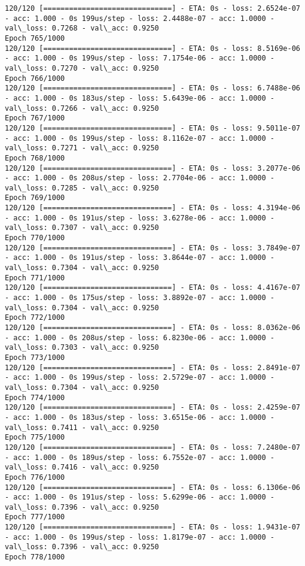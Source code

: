 \documentclass[11pt]{article}
\begin{document}
\begin{Verbatim}[commandchars=\\\{\}]
120/120 [==============================] - ETA: 0s - loss: 2.6524e-07 - acc: 1.000 - 0s 199us/step - loss: 2.4488e-07 - acc: 1.0000 - val\_loss: 0.7268 - val\_acc: 0.9250
Epoch 765/1000
120/120 [==============================] - ETA: 0s - loss: 8.5169e-06 - acc: 1.000 - 0s 199us/step - loss: 7.1754e-06 - acc: 1.0000 - val\_loss: 0.7270 - val\_acc: 0.9250
Epoch 766/1000
120/120 [==============================] - ETA: 0s - loss: 6.7488e-06 - acc: 1.000 - 0s 183us/step - loss: 5.6439e-06 - acc: 1.0000 - val\_loss: 0.7266 - val\_acc: 0.9250
Epoch 767/1000
120/120 [==============================] - ETA: 0s - loss: 9.5011e-07 - acc: 1.000 - 0s 199us/step - loss: 8.1162e-07 - acc: 1.0000 - val\_loss: 0.7271 - val\_acc: 0.9250
Epoch 768/1000
120/120 [==============================] - ETA: 0s - loss: 3.2077e-06 - acc: 1.000 - 0s 208us/step - loss: 2.7704e-06 - acc: 1.0000 - val\_loss: 0.7285 - val\_acc: 0.9250
Epoch 769/1000
120/120 [==============================] - ETA: 0s - loss: 4.3194e-06 - acc: 1.000 - 0s 191us/step - loss: 3.6278e-06 - acc: 1.0000 - val\_loss: 0.7307 - val\_acc: 0.9250
Epoch 770/1000
120/120 [==============================] - ETA: 0s - loss: 3.7849e-07 - acc: 1.000 - 0s 191us/step - loss: 3.8644e-07 - acc: 1.0000 - val\_loss: 0.7304 - val\_acc: 0.9250
Epoch 771/1000
120/120 [==============================] - ETA: 0s - loss: 4.4167e-07 - acc: 1.000 - 0s 175us/step - loss: 3.8892e-07 - acc: 1.0000 - val\_loss: 0.7304 - val\_acc: 0.9250
Epoch 772/1000
120/120 [==============================] - ETA: 0s - loss: 8.0362e-06 - acc: 1.000 - 0s 208us/step - loss: 6.8230e-06 - acc: 1.0000 - val\_loss: 0.7303 - val\_acc: 0.9250
Epoch 773/1000
120/120 [==============================] - ETA: 0s - loss: 2.8491e-07 - acc: 1.000 - 0s 199us/step - loss: 2.5729e-07 - acc: 1.0000 - val\_loss: 0.7304 - val\_acc: 0.9250
Epoch 774/1000
120/120 [==============================] - ETA: 0s - loss: 2.4259e-07 - acc: 1.000 - 0s 183us/step - loss: 3.6515e-06 - acc: 1.0000 - val\_loss: 0.7411 - val\_acc: 0.9250
Epoch 775/1000
120/120 [==============================] - ETA: 0s - loss: 7.2480e-07 - acc: 1.000 - 0s 189us/step - loss: 6.7552e-07 - acc: 1.0000 - val\_loss: 0.7416 - val\_acc: 0.9250
Epoch 776/1000
120/120 [==============================] - ETA: 0s - loss: 6.1306e-06 - acc: 1.000 - 0s 191us/step - loss: 5.6299e-06 - acc: 1.0000 - val\_loss: 0.7396 - val\_acc: 0.9250
Epoch 777/1000
120/120 [==============================] - ETA: 0s - loss: 1.9431e-07 - acc: 1.000 - 0s 199us/step - loss: 1.8179e-07 - acc: 1.0000 - val\_loss: 0.7396 - val\_acc: 0.9250
Epoch 778/1000

\end{Verbatim}
\end{document}
